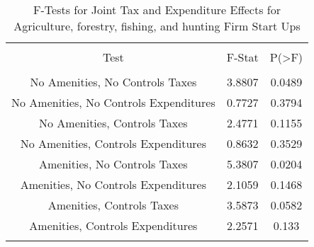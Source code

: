 
\begin{table}[!htbp] \centering 
  \caption{F-Tests for Joint Tax and Expenditure Effects for Agriculture, forestry, fishing, and hunting Firm Start Ups} 
  \label{11Ftests} 
\begin{tabular}{@{\extracolsep{5pt}} ccc} 
\\[-1.8ex]\hline 
\hline \\[-1.8ex] 
Test & F-Stat & P(\textgreater F) \\ 
\hline \\[-1.8ex] 
No Amenities, No Controls Taxes & 3.8807 & 0.0489 \\ 
No Amenities, No Controls Expenditures & 0.7727 & 0.3794 \\ 
No Amenities, Controls Taxes & 2.4771 & 0.1155 \\ 
No Amenities, Controls Expenditures & 0.8632 & 0.3529 \\ 
Amenities, No Controls Taxes & 5.3807 & 0.0204 \\ 
Amenities, No Controls Expenditures & 2.1059 & 0.1468 \\ 
Amenities, Controls Taxes & 3.5873 & 0.0582 \\ 
Amenities, Controls Expenditures & 2.2571 & 0.133 \\ 
\hline \\[-1.8ex] 
\end{tabular} 
\end{table} 
